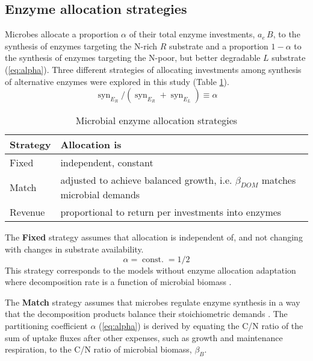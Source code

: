 \subsection{ Enzyme allocation strategies} 
\label{sec:AllocStrategies}

Microbes allocate a proportion $\alpha$ of their total enzyme investments,
$a_e\,B$, to the synthesis of enzymes targeting the N-rich $R$ substrate and
a proportion $1 - \alpha$ to the synthesis of enzymes targeting the N-poor, but
better degradable $L$ substrate (\ref{eq:alpha}). Three different strategies of
allocating investments among synthesis of alternative enzymes were explored in this study (Table
\ref{tab:AllocStrategies}).
\begin{equation} 
\label{eq:alpha}
\operatorname{syn}_{E_R} /
(\operatorname{syn}_{E_R} + \operatorname{syn}_{E_L}) \equiv \alpha
\end{equation}

\begin{table}[t]
\caption{Microbial enzyme allocation strategies \label{tab:AllocStrategies}}
\vskip4mm
\centering
\begin{tabular}{lp{6.5cm}}
\hline
Strategy &  Allocation is \\
\hline
Fixed & independent, constant \\
Match & adjusted to achieve balanced growth, i.e. $\beta_{DOM}$ matches
microbial demands  \\
Revenue & proportional to return per investments into enzymes \\
\hline
\end{tabular}
\end{table}


The \textbf{Fixed} strategy assumes that allocation is independent of,
and not changing with changes in substrate availability.
\begin{equation} 
\label{eq:allocFixed}
\alpha = \operatorname{const.} = 1/2
\end{equation}
This strategy corresponds to the models without enzyme allocation adaptation
where decomposition rate is a function of microbial biomass \citep{Wutzler08}.
 
The \textbf{Match} strategy assumes that microbes regulate enzyme synthesis in a
way that the decomposition products balance their stoichiometric demands
\citep{Moorhead12}. The partitioning coefficient $\alpha$ (\ref{eq:alpha}) is
derived by equating the C/N ratio of the sum of uptake fluxes after
other expenses, such as growth and maintenance respiration, to the
C/N ratio of microbial biomass, $\beta_B$.

